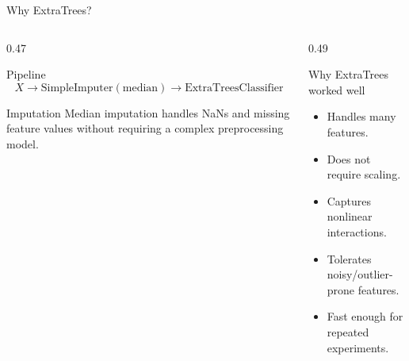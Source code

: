 \documentclass[10pt,aspectratio=169]{beamer}
\begin{document}
\begin{frame}{Why ExtraTrees?}
\small
\begin{columns}[T,totalwidth=\textwidth]
\begin{column}{0.47\textwidth}
\begin{block}{Pipeline}
\[
X \rightarrow \mathrm{SimpleImputer(median)} \rightarrow \mathrm{ExtraTreesClassifier}
\]
\end{block}
\begin{exampleblock}{Imputation}
Median imputation handles NaNs and missing feature values without requiring a complex preprocessing model.
\end{exampleblock}
\end{column}
\begin{column}{0.49\textwidth}
\begin{alertblock}{Why ExtraTrees worked well}
\begin{itemize}
  \item Handles many features.
  \item Does not require scaling.
  \item Captures nonlinear interactions.
  \item Tolerates noisy/outlier-prone features.
  \item Fast enough for repeated experiments.
\end{itemize}
\end{alertblock}
\end{column}
\end{columns}
\end{frame}
\end{document}
